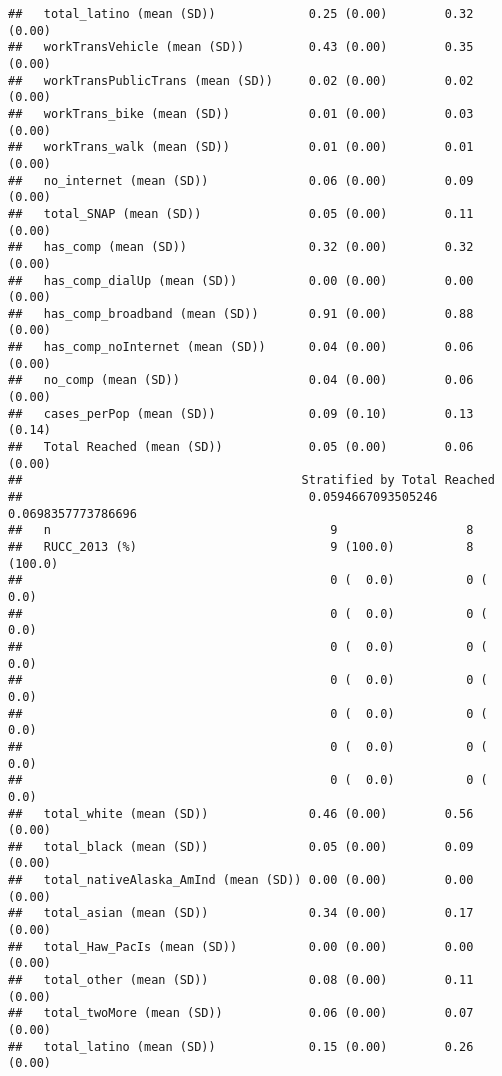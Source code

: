 \documentclass[
]{article}
\begin{document}
\begin{verbatim}
##   total_latino (mean (SD))             0.25 (0.00)        0.32 (0.00)      
##   workTransVehicle (mean (SD))         0.43 (0.00)        0.35 (0.00)      
##   workTransPublicTrans (mean (SD))     0.02 (0.00)        0.02 (0.00)      
##   workTrans_bike (mean (SD))           0.01 (0.00)        0.03 (0.00)      
##   workTrans_walk (mean (SD))           0.01 (0.00)        0.01 (0.00)      
##   no_internet (mean (SD))              0.06 (0.00)        0.09 (0.00)      
##   total_SNAP (mean (SD))               0.05 (0.00)        0.11 (0.00)      
##   has_comp (mean (SD))                 0.32 (0.00)        0.32 (0.00)      
##   has_comp_dialUp (mean (SD))          0.00 (0.00)        0.00 (0.00)      
##   has_comp_broadband (mean (SD))       0.91 (0.00)        0.88 (0.00)      
##   has_comp_noInternet (mean (SD))      0.04 (0.00)        0.06 (0.00)      
##   no_comp (mean (SD))                  0.04 (0.00)        0.06 (0.00)      
##   cases_perPop (mean (SD))             0.09 (0.10)        0.13 (0.14)      
##   Total Reached (mean (SD))            0.05 (0.00)        0.06 (0.00)      
##                                       Stratified by Total Reached
##                                        0.0594667093505246 0.0698357773786696
##   n                                       9                  8              
##   RUCC_2013 (%)                           9 (100.0)          8 (100.0)      
##                                           0 (  0.0)          0 (  0.0)      
##                                           0 (  0.0)          0 (  0.0)      
##                                           0 (  0.0)          0 (  0.0)      
##                                           0 (  0.0)          0 (  0.0)      
##                                           0 (  0.0)          0 (  0.0)      
##                                           0 (  0.0)          0 (  0.0)      
##                                           0 (  0.0)          0 (  0.0)      
##   total_white (mean (SD))              0.46 (0.00)        0.56 (0.00)       
##   total_black (mean (SD))              0.05 (0.00)        0.09 (0.00)       
##   total_nativeAlaska_AmInd (mean (SD)) 0.00 (0.00)        0.00 (0.00)       
##   total_asian (mean (SD))              0.34 (0.00)        0.17 (0.00)       
##   total_Haw_PacIs (mean (SD))          0.00 (0.00)        0.00 (0.00)       
##   total_other (mean (SD))              0.08 (0.00)        0.11 (0.00)       
##   total_twoMore (mean (SD))            0.06 (0.00)        0.07 (0.00)       
##   total_latino (mean (SD))             0.15 (0.00)        0.26 (0.00)       

\end{verbatim}
\end{document}
